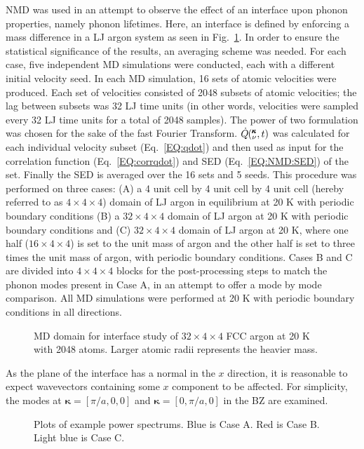 NMD was used in an attempt to observe the effect of an interface upon phonon properties, namely phonon lifetimes. Here, an interface is defined by enforcing a mass difference in a LJ argon system as seen in Fig.~\ref{fig:interface_domain}. In order to ensure the statistical significance of the results, an averaging scheme was needed. For each case, five independent MD simulations were conducted, each with a different initial velocity seed. In each MD simulation, 16 sets of atomic velocities were produced. Each set of velocities consisted of 2048 subsets of atomic velocities; the lag between subsets was 32 LJ time units (in other words, velocities were sampled every 32 LJ time units for a total of 2048 samples). The power of two formulation was chosen for the sake of the fast Fourier Transform. $\dot{Q}\mspace{-4.0mu}\left(\mspace{-8.0mu} \begin{smallmatrix}&\pmb{\kappa} \\&\nu\end{smallmatrix} \mspace{-2.0mu},t\right)$ was calculated for each individual velocity subset (Eq.~\ref{EQ:qdot}) and then used as input for the correlation function (Eq.~\ref{EQ:corrqdot}) and SED (Eq.~\ref{EQ:NMD:SED}) of the set. Finally the SED is averaged over the 16 sets and 5 seeds. This procedure was performed on three cases: (A) a 4 unit cell by 4 unit cell by 4 unit cell (hereby referred to as $4\times4\times4$) domain of LJ argon in equilibrium at 20 K with periodic boundary conditions (B) a $32\times4\times4$ domain of LJ argon at 20 K with periodic boundary conditions and (C) $32\times4\times4$ domain of LJ argon at 20 K, where one half ($16\times4\times4$) is set to the unit mass of argon and the other half is set to three times the unit mass of argon, with periodic boundary conditions. Cases B and C are divided into $4\times4\times4$ blocks for the post-processing steps to match the phonon modes present in Case A, in an attempt to offer a mode by mode comparison. All MD simulations were performed at 20 K with periodic boundary conditions in all directions.
\begin{figure}%
\begin{center}
\renewcommand{\figure}{Fig.}
\caption{MD domain for interface study of $32\times4\times4$ FCC argon at 20 K with 2048 atoms. Larger atomic radii represents the heavier mass.}
\label{fig:interface_domain}
\end{center}
\end{figure}
As the plane of the interface has a normal in the $x$ direction, it is reasonable to expect wavevectors containing some $x$ component to be affected. For simplicity, the modes at $\bm{\kappa}=[\pi/a,0,0]$ and $\bm{\kappa}=[0,\pi/a,0]$ in the BZ are examined. 
\renewcommand{\topfraction}{1.0}
\begin{figure*}%
\begin{center}
\renewcommand{\figure}{Fig.}
\caption{Plots of example power spectrums. Blue is Case A. Red is Case B. Light blue is Case C.}
\label{fig:sed}
\end{center}
\end{figure*}

